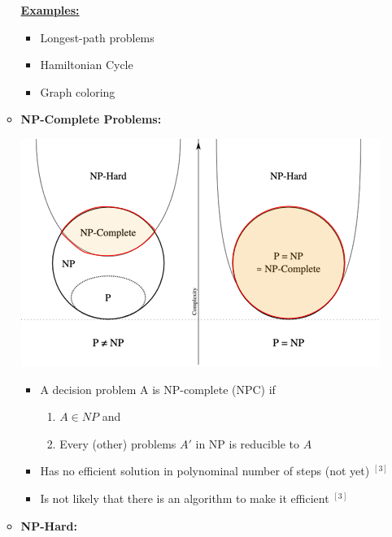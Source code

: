 \documentclass[12pt]{article}
\begin{document}
\begin{enumerate}[1.]
\begin{itemize}
        \bigskip

        \underline{\textbf{Examples:}}

        \begin{itemize}
            \item Longest-path problems
            \item Hamiltonian Cycle
            \item Graph coloring
        \end{itemize}

        \bigskip

        \item \textbf{NP-Complete Problems:}

        \begin{center}
        \includegraphics[width=0.7\linewidth]{images/worksheet_7_solution_3.png}
        \end{center}

        \begin{itemize}
            \item A decision problem A is NP-complete (NPC) if

            \begin{enumerate}[1)]
                \item $A \in NP$ and
                \item Every (other) problems $A'$ in NP is reducible to $A$
            \end{enumerate}
            \item Has no efficient solution in polynominal number of steps (not yet) $^{[3]}$
            \item Is not likely that there is an algorithm to make it efficient $^{[3]}$
        \end{itemize}

        \item \textbf{NP-Hard:}

        \bigskip


\end{itemize}
\end{enumerate}
\end{document}
